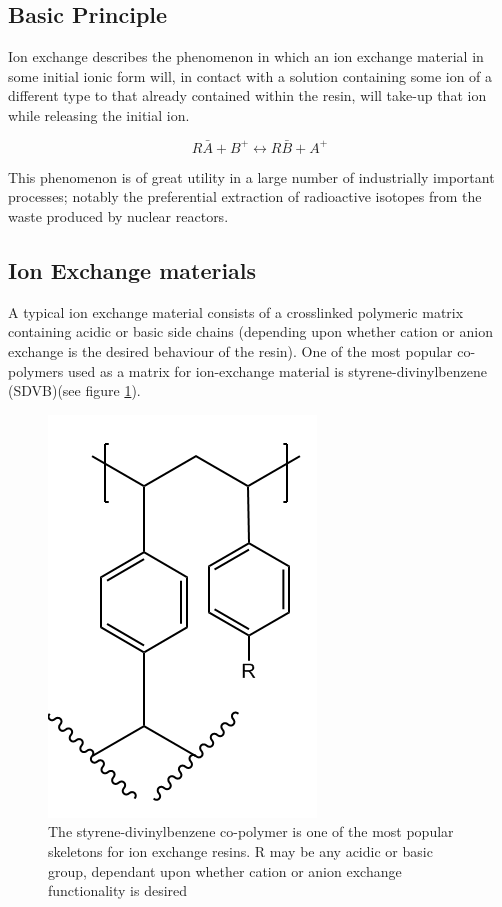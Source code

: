 \documentclass[twoside,twocolumn,9pt]{article}
\begin{document}
\subsection{Basic Principle}
Ion exchange describes the phenomenon in which an ion exchange material in some initial ionic form will, in contact with a solution containing some ion of a different type to that already contained within the resin, will take-up that ion while releasing the initial ion. 

\begin{equation}
R\bar{A} + B^+ \leftrightarrow R\bar{B} + A^+
\end{equation}

This phenomenon is of great utility in a large number of industrially important processes; notably the preferential extraction of radioactive isotopes from the waste produced by nuclear reactors.

\subsection{Ion Exchange materials}
A typical ion exchange material consists of a crosslinked polymeric matrix containing acidic or basic side chains (depending upon whether cation or anion exchange is the desired behaviour of the resin). One of the most popular co-polymers used as a matrix for ion-exchange material is styrene-divinylbenzene (SDVB)(see figure \ref{fig:sdvb}).

\begin{figure}[h !]
	\includegraphics[height=.2\textheight]{images/sdvb}
	\centering
	\caption{The styrene-divinylbenzene co-polymer is one of the most popular skeletons for ion exchange resins. R may be any acidic or basic group, dependant upon whether cation or anion exchange functionality is desired}
	\label{fig:sdvb}
\end{figure}
\end{document}
